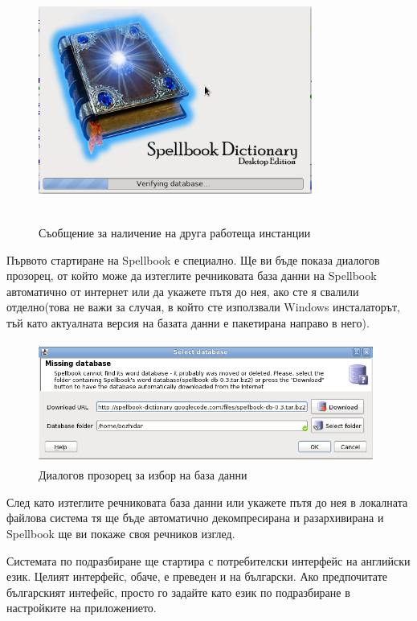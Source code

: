 \begin{figure}[htbp]
  \caption{Съобщение за наличение на друга работеща инстанции}
  \centering
  \includegraphics[width=90mm, height=80mm]{images/splashscreen.png}
\end{figure}

Първото стартиране на Spellbook е специално. Ще ви бъде показа
диалогов прозорец, от който може да изтеглите речниковата база данни
на Spellbook автоматично от интернет или да укажете пътя до нея, ако
сте я свалили отделно(това не важи за случая, в който сте използвали
Windows инсталаторът, тъй като актуалната версия на базата данни е
пакетирана направо в него).
\begin{figure}[htbp]
  \caption{Диалогов прозорец за избор на база данни}
  \centering
  \includegraphics[width=110mm, height=40mm]{images/select_db.png}
\end{figure}

След като изтеглите речниковата база данни или укажете пътя до нея в
локалната файлова система тя ще бъде автоматично декомпресирана и
разархивирана и Spellbook ще ви покаже своя речников изглед.

Системата по подразбиране ще стартира с потребителски интерфейс на
английски език. Целият интерфейс, обаче, е преведен и на
български. Ако предпочитате българският интефейс, просто го задайте
като език по подразбиране в настройките на приложението.
